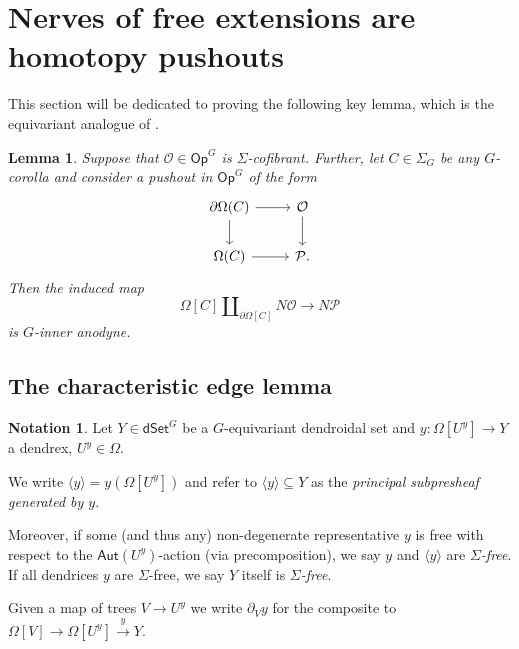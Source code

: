 \documentclass[a4paper,10pt
,draft
]{article}%
\numberwithin{equation}{section}
\numberwithin{figure}{section}
\newtheorem{lemma}[equation]{Lemma}%
\theoremstyle{definition} %
\newtheorem{notation}[equation]{Notation}%
\newcommand{\1}{\ensuremath{\mathbbm 1}}%
\begin{document}
 
\section{Nerves of free extensions are homotopy pushouts}
\label{KEYRES SEC}

This section will be dedicated to proving the following key lemma,
which is the equivariant analogue of
\cite[Prop. 3.2]{CM13b}.


\begin{lemma}\label{KEYPR LEM}
	Suppose that $\mathcal{O} \in \mathsf{Op}^{G}$
	is $\Sigma$-cofibrant.
	Further, let $C \in \Sigma_G$ be any $G$-corolla and consider 
	a pushout in $\mathsf{Op}^{G}$ of the form
	\begin{equation}\label{PUSHOUTPROP EQ}
	\begin{tikzcd}
	\partial \Omega(C) \ar{r} \ar{d} & \mathcal{O} \ar{d}
	\\
	\Omega(C) \ar{r} & \mathcal{P}.
	\end{tikzcd}
	\end{equation}
	Then the induced map
	\begin{equation}\label{ANODYNE MAP}
	\Omega[C] \amalg_{\partial \Omega[C]} N\mathcal{O} \to N\mathcal{P}
	\end{equation}
	is $G$-inner anodyne.
\end{lemma}




\subsection{The characteristic edge lemma}



\begin{notation}
	Let $Y \in \mathsf{dSet}^G$ be a $G$-equivariant dendroidal set and 
	$y \colon \Omega[U^y] \to Y$
	a dendrex, $U^y \in \Omega$.
	
	We write $\langle y \rangle = y\left(  \Omega[U^y] \right)$
	and refer to
	$\langle y \rangle \subseteq Y$
	as the \emph{principal subpresheaf generated by $y$}.
	
	Moreover, if some (and thus any)
	non-degenerate representative $y$ is free 
	with respect to the $\mathsf{Aut}(U^y)$-action (via precomposition),
	we say $y$ and $\langle y \rangle$ are \emph{$\Sigma$-free}.
	If all dendrices $y$ are $\Sigma$-free, we say $Y$ itself is \textit{$\Sigma$-free}.
	
	Given a map of trees $V \to U^y$ we write $\partial_V y$ for the composite to $\Omega[V] \to \Omega[U^y] \xrightarrow{y} Y$.
\end{notation}
\end{document}
